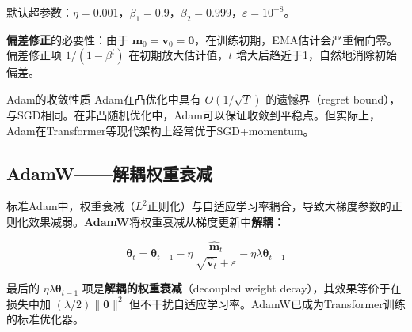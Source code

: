 默认超参数：$\eta = 0.001$，$\beta_1 = 0.9$，$\beta_2 = 0.999$，$\varepsilon = 10^{-8}$。

\textbf{偏差修正}的必要性：由于 $\mathbf{m}_0 = \mathbf{v}_0 = \mathbf{0}$，在训练初期，EMA估计会严重偏向零。偏差修正项 $1/(1 - \beta^t)$ 在初期放大估计值，$t$ 增大后趋近于1，自然地消除初始偏差。

\begin{myTheorem}{Adam的收敛性质}
Adam在凸优化中具有 $O(1/\sqrt{T})$ 的遗憾界（regret bound），与SGD相同。在非凸随机优化中，Adam可以保证收敛到平稳点。但实际上，Adam在Transformer等现代架构上经常优于SGD+momentum。
\end{myTheorem}

\subsection{AdamW——解耦权重衰减}

标准Adam中，权重衰减（$L^2$正则化）与自适应学习率耦合，导致大梯度参数的正则化效果减弱。\textbf{AdamW}将权重衰减从梯度更新中\textbf{解耦}：

\[
\boldsymbol{\theta}_{t} = \boldsymbol{\theta}_{t-1} - \eta\,\frac{\hat{\mathbf{m}}_t}{\sqrt{\hat{\mathbf{v}}_t} + \varepsilon} - \eta\lambda\boldsymbol{\theta}_{t-1}
\]

最后的 $\eta\lambda\boldsymbol{\theta}_{t-1}$ 项是\textbf{解耦的权重衰减}（decoupled weight decay），其效果等价于在损失中加 $(\lambda/2)\|\boldsymbol{\theta}\|^2$ 但不干扰自适应学习率。AdamW已成为Transformer训练的标准优化器。

